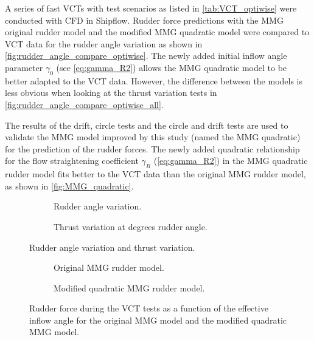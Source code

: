 \noindent A series of fast VCTs with test scenarios as listed in \autoref{tab:VCT_optiwise} were conducted with CFD in Shipflow. Rudder force predictions with the MMG original rudder model and the modified MMG quadratic model were compared to VCT data for the rudder angle variation as shown in \autoref{fig:rudder_angle_compare_optiwise}. The newly added initial inflow angle parameter $\gamma_0$ (see \autoref{eq:gamma_R2}) allows the MMG quadratic model to be better adapted to the VCT data. However, the difference between the models is less obvious when looking at the thrust variation tests in \autoref{fig:rudder_angle_compare_optiwise_all}.

The results of the drift, circle tests and the circle and drift tests are used to validate the MMG model improved by this study (named the MMG quadratic) for the prediction of the rudder forces.
The newly added quadratic relationship for the flow straightening coefficient $\gamma_R$ (\autoref{eq:gamma_R2}) in the MMG quadratic rudder model fits better to the VCT data than the original MMG rudder model, as shown in \autoref{fig:MMG_quadratic}.

\begin{figure}[h]
     \centering
     \begin{subfigure}[b]{0.49\textwidth}
         \centering
         
        \caption{Rudder angle variation.}
        \label{fig:rudder_angle_compare_optiwise}
     \end{subfigure}
     \hfill
     \begin{subfigure}[b]{0.49\textwidth}
         \centering
         
        \caption{Thrust variation at  degrees rudder angle.}
        \label{fig:thrust_variation_optiwise}
     \end{subfigure}
    \caption{Rudder angle variation and thrust variation.}
    \label{fig:rudder_angle_compare_optiwise_all}
\end{figure}


\begin{figure}[h]
     \centering
     \begin{subfigure}[b]{0.49\textwidth}
         \centering
         
        \caption{Original MMG rudder model.}
        \label{fig:Y_R_MMG_original}
     \end{subfigure}
     \hfill
     \begin{subfigure}[b]{0.49\textwidth}
         \centering
         
        \caption{Modified quadratic MMG rudder model.}
        \label{fig:Y_R_MMG_quadratic}
     \end{subfigure}
    \caption{Rudder force during the VCT tests as a function of the effective inflow angle for the original MMG model and the modified quadratic MMG model.}
    \label{fig:MMG_quadratic}
\end{figure}

